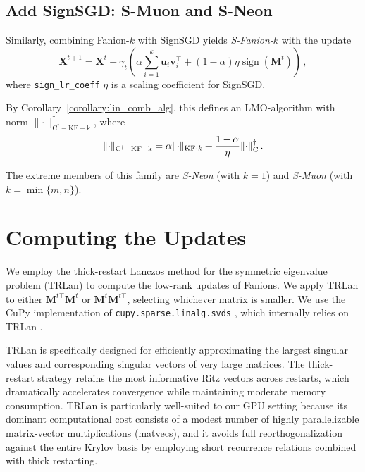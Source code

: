 \documentclass[a4paper,14pt,oneside]{extarticle}
\newcommand{\norm}[1]{\lVert #1\rVert}
\DeclarePairedDelimiter{\normc}{\|}{\|_{\mathrm{C}}}
\DeclarePairedDelimiter{\normkfk}{\|}{\|_{\text{KF-}k}}
\DeclareMathOperator{\sign}{sign}
\newcommand{\vu}{\mathbf{u}}
\newcommand{\vv}{\mathbf{v}}
\newcommand{\mX}{\mathbf{X}}
\newcommand{\mM}{\mathbf{M}}
\newcommand{\corollaryref}[1]{Corollary~\ref{#1}}
\begin{document}
\subsection{Add SignSGD: S-Muon and S-Neon}

Similarly, combining Fanion-$k$ with SignSGD yields \emph{S-Fanion-$k$} with the update
\begin{equation}\label{eq:sign_muon_update}
    \mX^{t+1} = \mX^{t} - \gamma_t \left(\alpha \sum_{i = 1}^k \vu_i \vv_i^\top + (1-\alpha)\eta\sign(\mM^t)\right)\,,
\end{equation}
where \texttt{sign\_lr\_coeff} $\eta$ is a scaling coefficient for SignSGD.

By \corollaryref{corollary:lin_comb_alg}, this defines an LMO-algorithm with norm $\norm{\cdot}_{\mathrm{C^\dagger-KF-k}}^\dagger$, where
\begin{equation}\label{eq:ckfk_norm}
  \norm{\cdot}_{\mathrm{C^\dagger-KF-k}} = \alpha \normkfk{\cdot} + \frac{1-\alpha}{\eta}\normc{\cdot}^\dagger\,.
\end{equation}

The extreme members of this family are \emph{S-Neon} (with $k = 1$) and \emph{S-Muon} (with $k = \min\{m, n\}$).

\section{Computing the Updates}\label{sec:matrix-side}
We employ the thick-restart Lanczos method for the symmetric eigenvalue problem (TRLan) to compute the low-rank updates of Fanions. We apply TRLan to either $\mM^{t\top}\mM^t$ or $\mM^t \mM^{t\top}$, selecting whichever matrix is smaller. We use the CuPy implementation of \texttt{cupy.sparse.linalg.svds} \citep{cupy_svds_ref}, which internally relies on TRLan \citep{simonz1998thick}.

TRLan is specifically designed for efficiently approximating the largest singular values and corresponding singular vectors of very large matrices. The thick-restart strategy retains the most informative Ritz vectors across restarts, which dramatically accelerates convergence while maintaining moderate memory consumption. TRLan is particularly well-suited to our GPU setting because its dominant computational cost consists of a modest number of highly parallelizable matrix-vector multiplications (matvecs), and it avoids full reorthogonalization against the entire Krylov basis by employing short recurrence relations combined with thick restarting.
\end{document}
